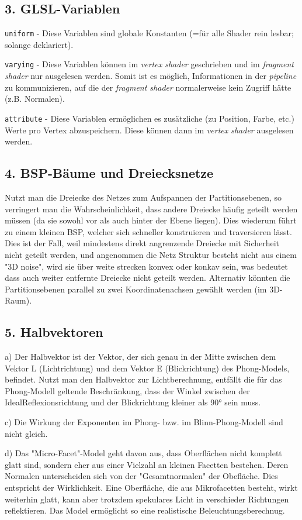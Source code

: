 \documentclass[a4paper,headings=small]{scrartcl}
\numberwithin{equation}{section} %
\numberwithin{figure}{section}   %
\begin{document}
\subsection*{3. GLSL-Variablen}

\texttt{uniform} - Diese Variablen sind globale Konstanten (=für alle Shader rein lesbar; solange deklariert).

\texttt{varying} - Diese Variablen können im \textit{vertex shader} geschrieben und im \textit{fragment shader} nur ausgelesen werden.
Somit ist es möglich, Informationen in der \textit{pipeline} zu kommunizieren, auf die der \textit{fragment shader} normalerweise kein Zugriff hätte (z.B. Normalen).

\texttt{attribute} - Diese Variablen ermöglichen es zusätzliche (zu Position, Farbe, etc.) Werte pro Vertex abzuspeichern. Diese können dann im \textit{vertex shader} ausgelesen werden.

\subsection*{4. BSP-Bäume und Dreiecksnetze}
Nutzt man die Dreiecke des Netzes zum Aufspannen der Partitionsebenen, so verringert man die Wahrscheinlichkeit, dass andere Dreiecke häufig geteilt werden müssen (da sie sowohl vor als auch hinter der Ebene liegen). Dies wiederum führt zu einem kleinen BSP, welcher sich schneller konstruieren und traversieren lässt.
Dies ist der Fall, weil mindestens direkt angrenzende Dreiecke mit Sicherheit nicht geteilt werden,
und angenommen die Netz Struktur besteht nicht aus einem "3D noise",
wird sie über weite strecken konvex oder konkav sein,
was bedeutet dass auch weiter entfernte Dreiecke nicht geteilt werden.
Alternativ könnten die Partitionsebenen parallel zu zwei Koordinatenachsen gewählt werden (im 3D-Raum).

\subsection*{5. Halbvektoren}
a) Der Halbvektor ist der Vektor, der sich genau in der Mitte zwischen dem Vektor L (Lichtrichtung) und dem Vektor E (Blickrichtung) des Phong-Models, befindet.
Nutzt man den Halbvektor zur Lichtberechnung, entfällt die für das Phong-Modell geltende Beschränkung, dass der Winkel zwischen der IdealReflexionsrichtung und der Blickrichtung kleiner als 90° sein muss.

c) Die Wirkung der Exponenten im Phong- bzw. im Blinn-Phong-Modell sind nicht gleich.

d) Das "Micro-Facet"-Model geht davon aus, dass Oberflächen nicht komplett glatt sind, sondern eher aus einer Vielzahl an kleinen Facetten bestehen. Deren Normalen unterscheiden sich von der "Gesamtnormalen" der Obefläche. Dies entspricht der Wirklichkeit. Eine Oberfläche, die aus Mikrofacetten besteht, wirkt weiterhin glatt, kann aber trotzdem spekulares Licht in verschieder Richtungen reflektieren. Das Model ermöglicht so eine realistische Beleuchtungsberechnug.
\end{document}
